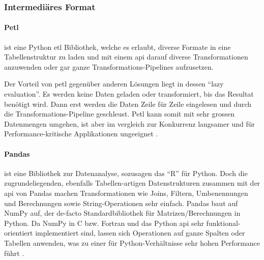\subsubsection{Intermediäres Format}
\paragraph{Petl} 
ist eine Python \acs{etl} Bibliothek, welche es erlaubt, diverse Formate in eine Tabellenstruktur zu laden und mit einem \acs{api} darauf diverse Transformationen anzuwenden oder gar ganze Transformations-Pipelines aufzusetzen.

Der Vorteil von petl gegenüber anderen Lösungen liegt in dessen ``lazy evaluation''. Es werden keine Daten geladen oder transformiert, bis das Resultat benötigt wird. Dann erst werden die Daten Zeile für Zeile eingelesen und durch die Transformations-Pipeline geschleust. Petl kann somit mit sehr grossen Datenmengen umgehen, ist aber im vergleich zur Konkurrenz langsamer und für Performance-kritische Applikationen ungeeignet \cite[Intro $\to$ Design goals]{petl}.

\paragraph{Pandas} ist eine Bibliothek zur Datenanalyse, sozusagen das ``R'' für Python. Doch die zugrundeliegenden, ebenfalls Tabellen-artigen Datenstrukturen zusammen mit der \acs{api} von Pandas machen Transformationen wie Joins, Filtern, Umbenennungen und Berechnungen sowie String-Operationen sehr einfach. Pandas baut auf NumPy auf, der de-facto Standardbibliothek für Matrizen/Berechnungen in Python. Da NumPy in C bzw. Fortran und das Python \acs{api} sehr funktional-orientiert implementiert sind, lassen sich Operationen auf ganze Spalten oder Tabellen anwenden, was zu einer für Python-Verhältnisse sehr hohen Performance führt \cite{pandasMergePerformance}.

